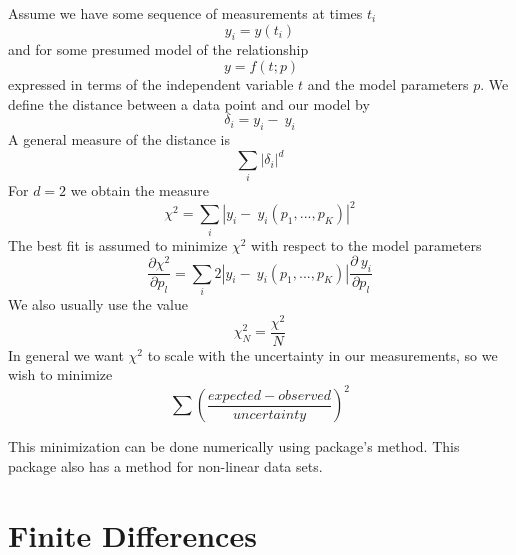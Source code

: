 \documentclass[12pt, a4paper, oneside, openright, titlepage]{book}
\begin{document}
\begin{proc}
        Assume we have some sequence of measurements at times $t_i$ \begin{equation}
                y_i = y(t_i)
        \end{equation}
        and for some presumed model of the relationship \begin{equation}
                ~y = f(t;p)
        \end{equation}
        expressed in terms of the independent variable $t$ and the model parameters $p$. We define the distance between a data point and our model by \begin{equation}
                \delta_i = y_i - ~y_i
        \end{equation}
        A general measure of the distance is \begin{equation}
                \sum_i|\delta_i|^d
        \end{equation}
        For $d = 2$ we obtain the  measure \begin{equation}
                \chi^2 = \sum_i|y_i - ~y_i(p_1,...,p_K)|^2
        \end{equation}
        The best fit is assumed to minimize $\chi^2$ with respect to the model parameters \begin{equation}
                \frac{\partial \chi^2}{\partial p_l} = \sum_i2|y_i - ~y_i(p_1,...,p_K)|\frac{\partial ~y_i}{\partial p_l}
        \end{equation}
        We also usually use the  value \begin{equation}
                \chi^2_N = \frac{\chi^2}{N}
        \end{equation}
        In general we want $\chi^2$ to scale with the uncertainty in our measurements, so we wish to minimize \begin{equation}
                \sum\left(\frac{expected-observed}{uncertainty}\right)^2
        \end{equation}
\end{proc}

\begin{rmk}
        This minimization can be done numerically using  package's  method. This package also has a  method for non-linear data sets.
\end{rmk}

\section{Finite Differences}
\end{document}
